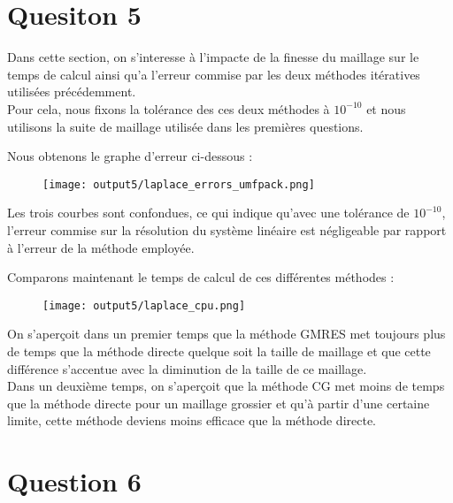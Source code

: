 \documentclass[11pt,a4paper]{report}
\begin{document}
			\section*{Quesiton 5}
				
				Dans cette section, on s'interesse à l'impacte de la finesse du maillage sur le temps de calcul ainsi qu'a l'erreur commise par les deux méthodes itératives utilisées précédemment.\\
				Pour cela, nous fixons la tolérance des ces deux méthodes à $10^{-10}$ et nous utilisons la suite de maillage utilisée dans les premières questions.

				Nous obtenons le graphe d'erreur ci-dessous :

				\begin{figure}[H]
					\centering
					\texttt{[image: output5/laplace\_errors\_umfpack.png]}
				\end{figure}

				Les trois courbes sont confondues, ce qui indique qu'avec une tolérance de $10^{-10}$, l'erreur commise sur la résolution du système linéaire est négligeable par rapport à l'erreur de la méthode employée.

				Comparons maintenant le temps de calcul de ces différentes méthodes :
				
				\begin{figure}[H]
					\centering
					\texttt{[image: output5/laplace\_cpu.png]}
				\end{figure}

				On s'aperçoit dans un premier temps que la méthode GMRES met toujours plus de temps que la méthode directe quelque soit la taille de maillage et que cette différence s'accentue avec la diminution de la taille de ce maillage.\\
				Dans un deuxième temps, on s'aperçoit que la méthode CG met moins de temps que la méthode directe pour un maillage grossier et qu'à partir d'une certaine limite, cette méthode deviens moins efficace que la méthode directe.
		
		\section*{Question 6}
\end{document}
